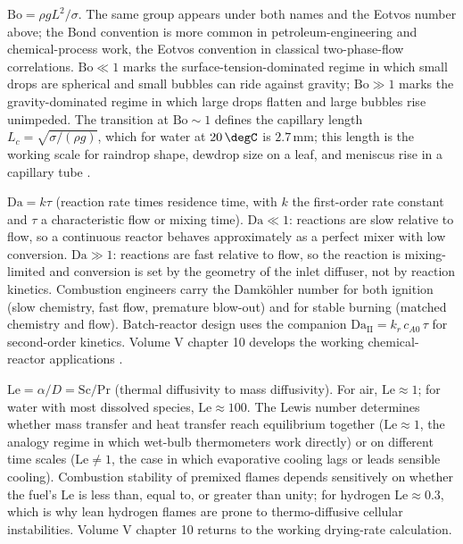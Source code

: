  $\mathrm{Bo} = \rho g L^{2}/\sigma$.
The same group appears under both names and the Eotvos number
above; the Bond convention is more common in petroleum-engineering
and chemical-process work, the Eotvos convention in classical
two-phase-flow correlations. $\mathrm{Bo} \ll 1$ marks the
surface-tension-dominated regime in which small drops are spherical
and small bubbles can ride against gravity; $\mathrm{Bo} \gg 1$
marks the gravity-dominated regime in which large drops flatten and
large bubbles rise unimpeded. The transition at $\mathrm{Bo} \sim 1$
defines the capillary length $L_{c} = \sqrt{\sigma/(\rho g)}$, which
for water at $20 \,\degC$ is $2.7 \,\si{\milli\meter}$; this length
is the working scale for raindrop shape, dewdrop size on a leaf,
and meniscus rise in a capillary tube
\cite{text:ch02t3b-bird-stewart-lightfoot-2007}.

 $\mathrm{Da} = k \tau$ (reaction rate
times residence time, with $k$ the first-order rate constant and
$\tau$ a characteristic flow or mixing time). $\mathrm{Da} \ll 1$:
reactions are slow relative to flow, so a continuous reactor
behaves approximately as a perfect mixer with low conversion.
$\mathrm{Da} \gg 1$: reactions are fast relative to flow, so the
reaction is mixing-limited and conversion is set by the geometry
of the inlet diffuser, not by reaction kinetics. Combustion
engineers carry the Damk\"ohler number for both ignition (slow
chemistry, fast flow, premature blow-out) and for stable burning
(matched chemistry and flow). Batch-reactor design uses the
companion $\mathrm{Da}_{\text{II}} = k_{r}\,c_{A0}\,\tau$ for
second-order kinetics. Volume V chapter 10 develops the working
chemical-reactor applications
\cite{text:ch02t3b-bird-stewart-lightfoot-2007}.

 $\mathrm{Le} = \alpha/D = \mathrm{Sc}/
\mathrm{Pr}$ (thermal diffusivity to mass diffusivity). For air,
$\mathrm{Le} \approx 1$; for water with most dissolved species,
$\mathrm{Le} \approx 100$. The Lewis number determines whether
mass transfer and heat transfer reach equilibrium together
($\mathrm{Le} \approx 1$, the analogy regime in which wet-bulb
thermometers work directly) or on different time scales
($\mathrm{Le} \ne 1$, the case in which evaporative cooling lags
or leads sensible cooling). Combustion stability of premixed
flames depends sensitively on whether the fuel's $\mathrm{Le}$ is
less than, equal to, or greater than unity; for hydrogen
$\mathrm{Le} \approx 0.3$, which is why lean hydrogen flames are
prone to thermo-diffusive cellular instabilities. Volume V chapter
10 returns to the working drying-rate calculation.

